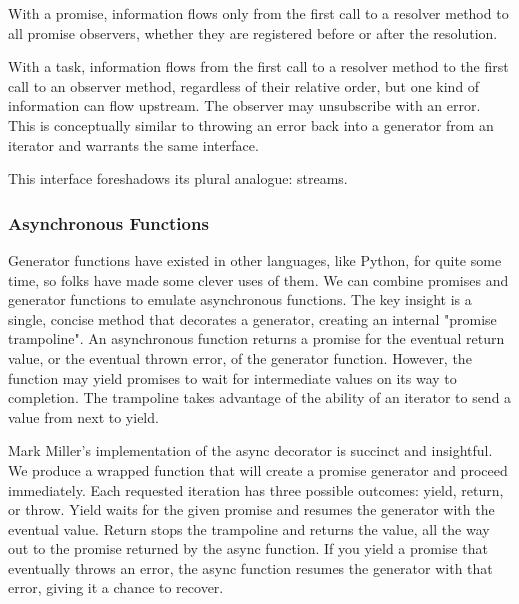 With a promise, information flows only from the first call to a resolver method to all promise observers, whether they are registered before or after the resolution.

With a task, information flows from the first call to a resolver method to the first call to an observer method, regardless of their relative order, but one kind of information can flow upstream. The observer may unsubscribe with an error. This is conceptually similar to throwing an error back into a generator from an iterator and warrants the same interface.

This interface foreshadows its plural analogue: streams.

\subsubsection{Asynchronous Functions}

Generator functions have existed in other languages, like Python, for quite some time, so folks have made some clever uses of them. We can combine promises and generator functions to emulate asynchronous functions. The key insight is a single, concise method that decorates a generator, creating an internal "promise trampoline". An asynchronous function returns a promise for the eventual return value, or the eventual thrown error, of the generator function. However, the function may yield promises to wait for intermediate values on its way to completion. The trampoline takes advantage of the ability of an iterator to send a value from next to yield.

Mark Miller’s implementation of the async decorator is succinct and insightful. We produce a wrapped function that will create a promise generator and proceed immediately. Each requested iteration has three possible outcomes: yield, return, or throw. Yield waits for the given promise and resumes the generator with the eventual value. Return stops the trampoline and returns the value, all the way out to the promise returned by the async function. If you yield a promise that eventually throws an error, the async function resumes the generator with that error, giving it a chance to recover.

